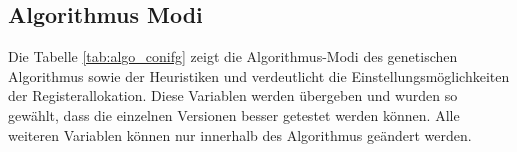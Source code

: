 \newpage
\subsection{Algorithmus Modi}
Die Tabelle \ref{tab:algo_conifg} zeigt die Algorithmus-Modi des genetischen Algorithmus sowie der Heuristiken und verdeutlicht die Einstellungsmöglichkeiten der Registerallokation. Diese Variablen werden übergeben und wurden so gewählt, dass die einzelnen Versionen besser getestet werden können. 
Alle weiteren Variablen können nur innerhalb des Algorithmus geändert werden.

%	


